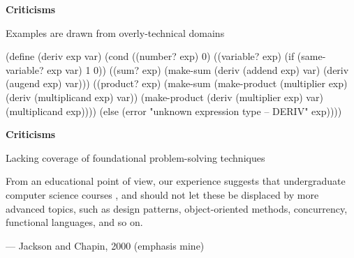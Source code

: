 
\begin{frame}[fragile]

\begin{center}
{\bf Criticisms}
\end{center}
\begin{center}
Examples are drawn from overly-technical domains

\nl

{\scriptsize
\begin{schemecode}
(define (deriv exp var)
  (cond ((number? exp) 0)
        ((variable? exp)
         (if (same-variable? exp var) 1 0))
        ((sum? exp)
         (make-sum (deriv (addend exp) var)
                   (deriv (augend exp) var)))
        ((product? exp)
         (make-sum
           (make-product (multiplier exp)
                         (deriv (multiplicand exp) var))
           (make-product (deriv (multiplier exp) var)
                         (multiplicand exp))))
        (else
         (error "unknown expression type -- DERIV" exp))))
\end{schemecode}
}
\end{center}
\end{frame}


\begin{frame}

\begin{center}
{\bf Criticisms}
\end{center}
\begin{center}
Lacking coverage of foundational problem-solving techniques
\end{center}

\begin{block}{}
From an educational point of view, our experience suggests that undergraduate \\
computer science courses 
, and should not let these be displaced by more advanced topics,
such as design patterns, object-oriented methods, concurrency, functional languages,
and so on.

\nl

--- Jackson and Chapin, 2000
(emphasis mine)
\end{block}
\end{frame}








